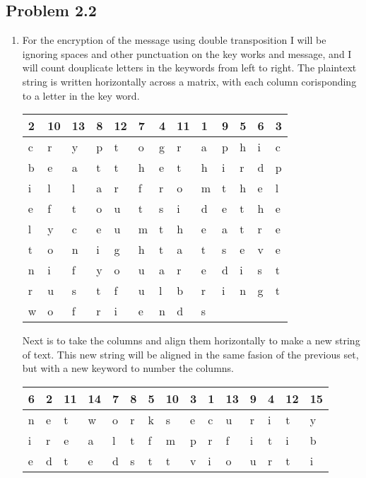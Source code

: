 \documentclass[14pt]{article}
\begin{document}
\subsection{Problem  2.2}
\begin{enumerate}[label=(\alph*)]
\item For the encryption of the message using double transposition I will be ignoring spaces and other punctuation on the key works and message, and I will count douplicate letters in the keywords from left to right. The plaintext string is written horizontally across a matrix, with each column corisponding to a letter in the key word.
\newline
\begin{tabular}{ l l l l l l l l l l l l l }
2 & 10 & 13 & 8 & 12 & 7 & 4 & 11 & 1 & 9 & 5 & 6 & 3\\
\hline
c & r & y & p & t & o & g & r & a & p & h & i & c\\
\hline
b & e & a & t & t & h & e & t & h & i & r & d & p\\
i & l & l & a & r & f & r & o & m & t & h & e & l\\
e & f & t & o & u & t & s & i & d & e & t & h & e\\
l & y & c & e & u & m & t & h & e & a & t & r & e\\
t & o & n & i & g & h & t & a & t & s & e & v & e\\
n & i & f & y & o & u & a & r & e & d & i & s & t\\
r & u & s & t & f & u & l & b & r & i & n & g & t\\
w & o & f & r & i & e & n & d & s\\
\end{tabular}
\newline
\newline
 Next is to take the columns and align them horizontally to make a new string of text. This new string will be aligned in the same fasion of the previous set, but with a new keyword to number the columns. 
\newline
\newline
\begin{tabular}{ l l l l l l l l l l l l l l l}
6 & 2 & 11 & 14 & 7 & 8 & 5 & 10 & 3 & 	1 & 13 & 9 & 4 & 12 & 15\\
\hline
n & e & t & w & o & r & k & s & e & c & u & r & i & t & y\\
\hline
i & r & e & a & l & t & f & m & p & r & f & i & t & i & b\\
e & d & t & e & d & s & t & t & v & i & o & u & r & t & i\\

\end{tabular}
\end{enumerate}
\end{document}
